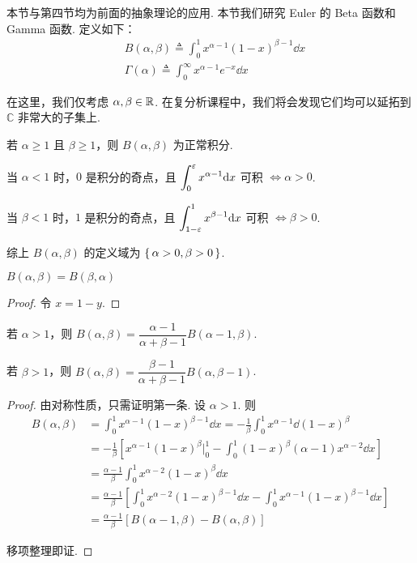 本节与第四节均为前面的抽象理论的应用. 本节我们研究 Euler 的 Beta 函数和 Gamma 函数. 定义如下：
$$
\begin{aligned}
    &B(\alpha,\beta)\triangleq\int_0^1x^{\alpha-1}(1-x)^{\beta-1}\dd x\\
    &\Gamma(\alpha)\triangleq\int_0^\infty x^{\alpha-1}e^{-x}\dd x
\end{aligned}
$$

在这里，我们仅考虑 $\alpha,\beta\in\mathbb{R}$. 在复分析课程中，我们将会发现它们均可以延拓到 $\mathbb{C}$ 非常大的子集上.



若 $\alpha\ge 1$ 且 $\beta\ge 1$，则 $B(\alpha,\beta)$ 为正常积分.

当 $\alpha<1$ 时，$0$ 是积分的奇点，且 $\displaystyle\int_0^\varepsilon x^{\alpha-1}\mathrm{d} x$ 可积 $\iff\alpha>0$.

当 $\beta<1$ 时，$1$ 是积分的奇点，且 $\displaystyle\int_{1-\varepsilon}^1 x^{\beta-1}\mathrm{d} x$ 可积 $\iff\beta>0$.

综上 $B(\alpha,\beta)$ 的定义域为 $\set{\alpha>0,\beta>0}$.


\begin{property}
    $B(\alpha,\beta)=B(\beta,\alpha)$
\end{property}
\begin{proof}
    令 $x=1-y$.
\end{proof}


\begin{property}
    若 $\alpha>1$，则 $B(\alpha,\beta)=\dfrac{\alpha-1}{\alpha+\beta-1}B(\alpha-1,\beta)$.

    若 $\beta>1$，则 $B(\alpha,\beta)=\dfrac{\beta-1}{\alpha+\beta-1}B(\alpha,\beta-1)$.
\end{property}
\begin{proof}
    由对称性质，只需证明第一条. 设 $\alpha>1$. 则
$$
\begin{aligned}
    B(\alpha,\beta)&=\int_0^1x^{\alpha-1}(1-x)^{\beta-1}\dd x=-\frac{1}{\beta}\int_0^1x^{\alpha-1}\dd(1-x)^\beta\\
    &=-\frac{1}{\beta}\left[x^{\alpha-1}(1-x)^\beta\biggr |_0^1-\int_0^1(1-x)^\beta(\alpha-1)x^{\alpha-2}\dd x\right]\\
    &=\frac{\alpha-1}{\beta}\int_0^1x^{\alpha-2}(1-x)^\beta\dd x\\
    &=\frac{\alpha-1}{\beta}\left[\int_0^1x^{\alpha-2}(1-x)^{\beta-1}\dd x-\int_0^1x^{\alpha-1}(1-x)^{\beta-1}\dd x\right]\\
    &=\frac{\alpha-1}{\beta}[B(\alpha-1,\beta)-B(\alpha,\beta)]
\end{aligned}
$$

    移项整理即证.
\end{proof}

